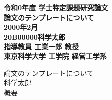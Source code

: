 \documentclass[uplatex,dvipdfmx]{bxjsarticle}
\def\YEAR{2000}
\def\REIWA{0}
\def\MONTH{2}
\def\ID{20B00000}
\def\NAME{科学太郎}
\def\DEGREE{学士}
\def\PROF{工業一郎 教授}
\def\TITLE{論文のテンプレートについて}
\begin{document}
\begin{titlepage}
    \centering
    \LARGE\bfseries
    令和\REIWA 年度 \DEGREE 特定課題研究論文\\[4em]
    {\Huge\TITLE}\\
    \vfill
    \YEAR 年\MONTH 月 \\[1em]
    \ID  \NAME\\[1em]
    指導教員 \PROF\\[1em]
    東京科学大学 工学院 経営工学系
\end{titlepage}

\begin{center}
\TITLE\\[1em]
\NAME\\[4em]
概要\\[1em]

\end{center}

\newpage
\tableofcontents
\newpage

















\end{document}
